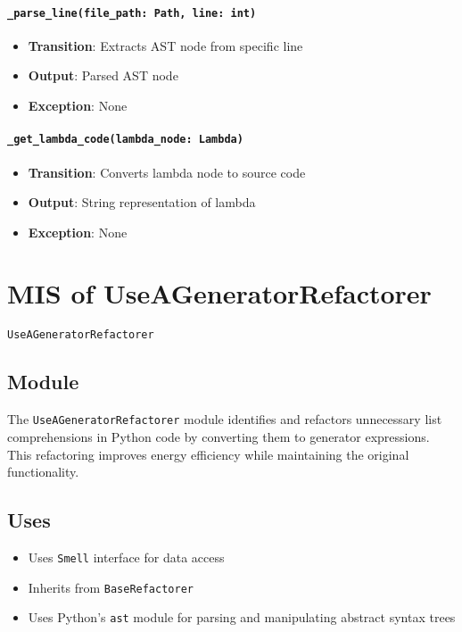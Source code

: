 \documentclass[12pt, titlepage]{article}
\begin{document}
\paragraph{\texttt{\_parse\_line(file\_path: Path, line: int)}}
\begin{itemize}
  \item \textbf{Transition}: Extracts AST node from specific line
  \item \textbf{Output}: Parsed AST node
  \item \textbf{Exception}: None
\end{itemize}

\paragraph{\texttt{\_get\_lambda\_code(lambda\_node: Lambda)}}
\begin{itemize}
  \item \textbf{Transition}: Converts lambda node to source code
  \item \textbf{Output}: String representation of lambda
  \item \textbf{Exception}: None
\end{itemize}

\newpage
\section{MIS of UseAGeneratorRefactorer} \label{mis:UseGen}

\texttt{UseAGeneratorRefactorer}

\subsection{Module}

The \texttt{UseAGeneratorRefactorer} module identifies and refactors 
unnecessary list comprehensions in Python code by converting them to generator expressions. This refactoring improves energy efficiency while maintaining the original functionality.

\subsection{Uses}
\begin{itemize}
\item Uses \texttt{Smell} interface for data access
\item Inherits from \texttt{BaseRefactorer}
\item Uses Python's \texttt{ast} module for parsing and manipulating abstract syntax trees
\end{itemize}
\end{document}
